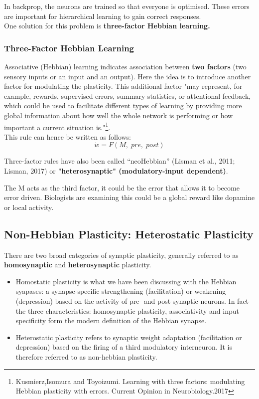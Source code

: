 \documentclass[main]{subfiles}
\begin{document}
\noindent
In backprop, the neurons are trained so that everyone is optimised. These errors are important for hierarchical learning to gain correct responses. \\

\noindent
One solution for this problem is\textbf{ three-factor Hebbian learning.} 
\subsubsection{Three-Factor Hebbian Learning}
Associative (Hebbian) learning indicates association between \textbf{two factors} (two sensory inputs or an input and an output). Here the idea is to introduce another factor for modulating the plasticity. This additional factor "may represent, for example, rewards, supervised errors, summary statistics, or attentional feedback, which could be used to facilitate different types of learning by providing more global information about how well the whole network is performing or how important a current situation is."\footnote{Kusmierz,Isomura and Toyoizumi. Learning with three factors: modulating Hebbian plasticity with errors. Current Opinion in Neurobiology.2017}. \\

This rule can hence be written as follows:
\begin{equation}
    \dot{w}= F(M,\; pre, \;post)
\end{equation}

Three-factor rules have also been called “neoHebbian” (Lisman et al., 2011; Lisman, 2017) or \textbf{"heterosynaptic" (modulatory-input dependent)}.

The M acts as the third factor, it could be the error that allows it to become error driven. Biologists are examining this could be a global reward like dopamine or local activity. 

\subsection{Non-Hebbian Plasticity: Heterostatic Plasticity}
There are two broad categories of synaptic plasticity, generally referred to as \textbf{homosynaptic} and \textbf{heterosynaptic} plasticity.

\begin{itemize}
    \item Homostatic plasticity is what we have been discussing with the Hebbian syapases: a synapse-specific strengthening (facilitation) or weakening (depression) based on the activity of pre- and post-synaptic neurons. In fact the three characteristics: homosynaptic plasticity, associativity and input specificity form the modern definition of the Hebbian synapse.
    
    \item Heterostatic plasticity refers to synaptic weight adaptation (facilitation or depression) based on the firing of a third modulatory interneuron. It is therefore referred to as non-hebbian plasticity.
    
\end{itemize}
\end{document}
